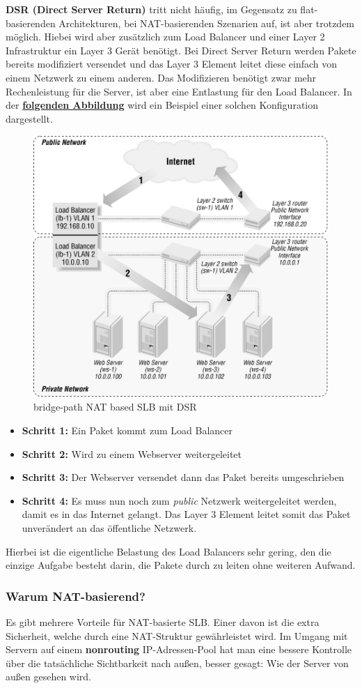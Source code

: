 \textbf{DSR (Direct Server Return)} tritt nicht häufig, im Gegensatz zu flat-basierenden Architekturen, bei NAT-basierenden Szenarien auf, ist aber trotzdem möglich. Hiebei wird aber zusätzlich zum Load Balancer und einer Layer 2 Infrastruktur ein Layer 3 Gerät benötigt. Bei Direct Server Return werden Pakete bereits modifiziert versendet und das Layer 3 Element leitet diese einfach von einem Netzwerk zu einem anderen. Das Modifizieren benötigt zwar mehr Rechenleistung für die Server, ist aber eine Entlastung für den Load Balancer. In der \textbf{\hyperref[nat_slb_03]{folgenden Abbildung}} wird ein Beispiel einer solchen Konfiguration dargestellt.
\begin{figure}[!h]
	\begin{center}
		\includegraphics[width=0.5\linewidth]{images/slb_0703}
		\caption{bridge-path NAT based SLB mit DSR}
		\label{nat_slb_03}
	\end{center}
\end{figure}

\begin{itemize}
	\item \textbf{Schritt 1:}
	\subitem Ein Paket kommt zum Load Balancer
	\item \textbf{Schritt 2:}
	\subitem Wird zu einem Webserver weitergeleitet
	\item \textbf{Schritt 3:}
	\subitem Der Webserver versendet dann das Paket bereits umgeschrieben
	\item \textbf{Schritt 4:}
	\subitem Es muss nun noch zum \textit{public} Netzwerk weitergeleitet werden, damit es in das Internet gelangt. Das  Layer 3 Element leitet somit das Paket unverändert an das öffentliche Netzwerk.
\end{itemize}
Hierbei ist die eigentliche Belastung des Load Balancers sehr gering, den die einzige Aufgabe besteht darin, die Pakete durch zu leiten ohne weiteren Aufwand.

\subsubsection{Warum NAT-basierend?}
Es gibt mehrere Vorteile für NAT-basierte SLB. Einer davon ist die extra Sicherheit, welche durch eine NAT-Struktur gewährleistet wird. Im Umgang mit Servern auf einem \textbf{nonrouting} IP-Adressen-Pool hat man eine bessere Kontrolle über die tatsächliche Sichtbarkeit nach außen, besser gesagt: Wie der Server von außen gesehen wird.


